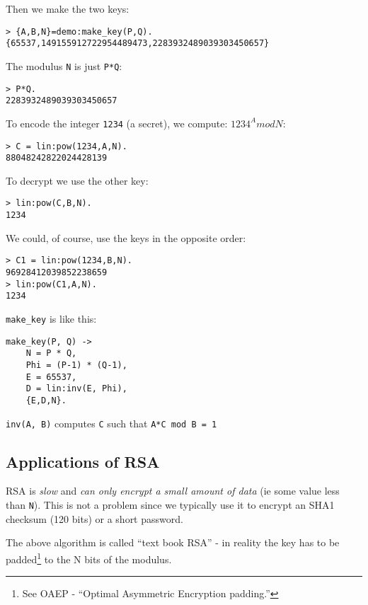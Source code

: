 \documentclass[12pt]{article}
\begin{document}
Then we make the two keys:

\begin{verbatim}
> {A,B,N}=demo:make_key(P,Q).
{65537,149155912722954489473,2283932489039303450657}
\end{verbatim}

The modulus \verb+N+ is just \verb+P*Q+:

\begin{verbatim}
> P*Q.
2283932489039303450657
\end{verbatim}

To encode the integer \verb+1234+ (a secret), we compute:
$1234^A mod N$:

\begin{verbatim}
> C = lin:pow(1234,A,N). 
88048242822024428139
\end{verbatim}

To decrypt we use the other key:

\begin{verbatim}
> lin:pow(C,B,N). 
1234
\end{verbatim}

We could, of course, use the keys in the opposite order:

\begin{verbatim}
> C1 = lin:pow(1234,B,N).
96928412039852238659
> lin:pow(C1,A,N).       
1234
\end{verbatim}

\verb+make_key+ is like this:

\begin{Verbatim}[frame=single]
make_key(P, Q) ->
    N = P * Q,
    Phi = (P-1) * (Q-1),
    E = 65537,
    D = lin:inv(E, Phi),
    {E,D,N}.
\end{Verbatim}

\verb+inv(A, B)+ computes \verb+C+ such that \verb+A*C mod B = 1+

\subsection{Applications of RSA}

RSA is {\sl slow} and {\sl can only encrypt a small amount of data}
(ie some value less than \verb+N+). This is not a problem since we
typically use it to encrypt an SHA1 checksum (120 bits) or a short password.

The above algorithm is called ``text book RSA'' - in reality
the key has to be padded\footnote{See OAEP - ``Optimal Asymmetric Encryption padding.''}
to the N bits of the modulus.
\end{document}
